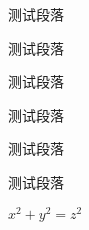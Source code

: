 \documentclass[11pt,a4paper]{article}
\theoremstyle{mystyle}
\begin{document}
\setlength{\parskip}{0em}



测试段落

测试段落

测试段落


\setlength{\parskip}{0.5\baselineskip}



测试段落

测试段落

测试段落

$x^2+y^2=z^2$

	
\end{document}
